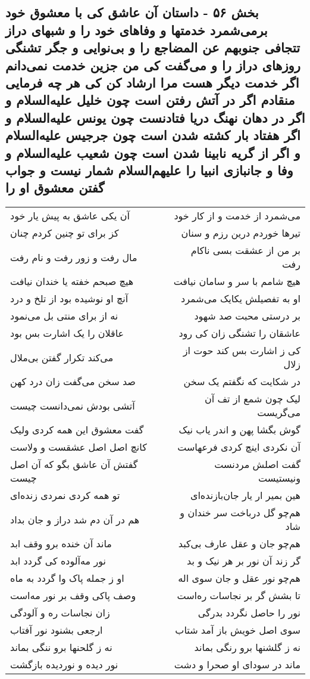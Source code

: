 \begin{center}
\section*{بخش ۵۶ - داستان آن عاشق کی با معشوق خود برمی‌شمرد خدمتها و وفاهای خود را و شبهای دراز تتجافی جنوبهم عن المضاجع را و بی‌نوایی و جگر تشنگی روزهای دراز را و می‌گفت کی من جزین خدمت نمی‌دانم اگر خدمت دیگر هست مرا ارشاد کن کی هر چه فرمایی منقادم اگر در آتش رفتن است چون خلیل علیه‌السلام  و اگر در دهان نهنگ دریا فتادنست چون یونس علیه‌السلام و اگر هفتاد بار کشته شدن است چون جرجیس علیه‌السلام  و اگر از گریه نابینا شدن است چون شعیب علیه‌السلام و وفا و جانبازی انبیا را علیهم‌السلام شمار نیست و جواب گفتن معشوق او را}
\label{sec:sh056}
\begin{longtable}{l p{0.5cm} r}
آن یکی عاشق به پیش یار خود
&&
می‌شمرد از خدمت و از کار خود
\\
کز برای تو چنین کردم چنان
&&
تیرها خوردم درین رزم و سنان
\\
مال رفت و زور رفت و نام رفت
&&
بر من از عشقت بسی ناکام رفت
\\
هیچ صبحم خفته یا خندان نیافت
&&
هیچ شامم با سر و سامان نیافت
\\
آنچ او نوشیده بود از تلخ و درد
&&
او به تفصیلش یکایک می‌شمرد
\\
نه از برای منتی بل می‌نمود
&&
بر درستی محبت صد شهود
\\
عاقلان را یک اشارت بس بود
&&
عاشقان را تشنگی زان کی رود
\\
می‌کند تکرار گفتن بی‌ملال
&&
کی ز اشارت بس کند حوت از زلال
\\
صد سخن می‌گفت زان درد کهن
&&
در شکایت که نگفتم یک سخن
\\
آتشی بودش نمی‌دانست چیست
&&
لیک چون شمع از تف آن می‌گریست
\\
گفت معشوق این همه کردی ولیک
&&
گوش بگشا پهن و اندر یاب نیک
\\
کانچ اصل اصل عشقست و ولاست
&&
آن نکردی اینچ کردی فرعهاست
\\
گفتش آن عاشق بگو که آن اصل چیست
&&
گفت اصلش مردنست ونیستیست
\\
تو همه کردی نمردی زنده‌ای
&&
هین بمیر ار یار جان‌بازنده‌ای
\\
هم در آن دم شد دراز و جان بداد
&&
هم‌چو گل درباخت سر خندان و شاد
\\
ماند آن خنده برو وقف ابد
&&
هم‌چو جان و عقل عارف بی‌کبد
\\
نور مه‌آلوده کی گردد ابد
&&
گر زند آن نور بر هر نیک و بد
\\
او ز جمله پاک وا گردد به ماه
&&
هم‌چو نور عقل و جان سوی اله
\\
وصف پاکی وقف بر نور مه‌است
&&
تا بشش گر بر نجاسات ره‌است
\\
زان نجاسات ره و آلودگی
&&
نور را حاصل نگردد بدرگی
\\
ارجعی بشنود نور آفتاب
&&
سوی اصل خویش باز آمد شتاب
\\
نه ز گلحنها برو ننگی بماند
&&
نه ز گلشنها برو رنگی بماند
\\
نور دیده و نوردیده بازگشت
&&
ماند در سودای او صحرا و دشت
\\
\end{longtable}
\end{center}
